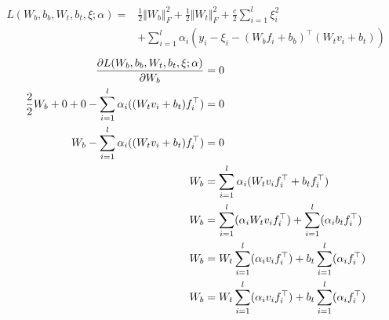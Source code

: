\begin{equation}
  \begin{aligned}
    L(W_b,b_b,W_t,b_t,\xi;\alpha)= {} & \frac{1}{2}\Vert W_b\Vert_F^2 + \frac{1}{2}\Vert W_t\Vert_F^2 +\frac{c}{2}\sum_{i=1}^{l}\xi_i^2 \\ &+ \sum_{i=1}^{l}\alpha_i(y_i-\xi_i-(W_b f_i+b_b)^\top(W_t v_i+b_t))
  \end{aligned}
\end{equation}
\begin{equation}
  \begin{aligned}
    \pdv{L(W_b,b_b,W_t,b_t,\xi;\alpha)}{W_b}                               & = 0                                                                                \\
    \frac{2}{2}W_b + 0 + 0 - \sum_{i=1}^{l}\alpha_i((W_t v_i+b_t)f_i^\top) & = 0                                                                                \\
    W_b - \sum_{i=1}^{l}\alpha_i((W_t v_i+b_t)f_i^\top)                    & = 0                                                                                \\
    W_b                                                                    & = \sum_{i=1}^{l}\alpha_i(W_t v_i f_i^\top+b_t f_i^\top)                            \\
    W_b                                                                    & = \sum_{i=1}^{l}(\alpha_i W_t v_i f_i^\top)+ \sum_{i=1}^{l}(\alpha_i b_t f_i^\top) \\
    W_b                                                                    & = W_t \sum_{i=1}^{l}(\alpha_i v_i f_i^\top)+ b_t \sum_{i=1}^{l}(\alpha_i f_i^\top) \\
    W_b                                                                    & = W_t \sum_{i=1}^{l}(\alpha_i v_i f_i^\top)+ b_t \sum_{i=1}^{l}(\alpha_i f_i^\top) \\
  \end{aligned}
\end{equation}
